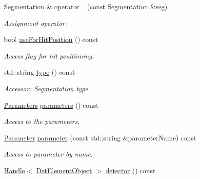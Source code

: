 \begin{DoxyCompactItemize}
\hyperlink{class_d_d4hep_1_1_geometry_1_1_segmentation}{Segmentation} \& \hyperlink{class_d_d4hep_1_1_geometry_1_1_segmentation_ace2a6174d3578ff2fdee66e0de399219}{operator=} (const \hyperlink{class_d_d4hep_1_1_geometry_1_1_segmentation}{Segmentation} \&seg)
\begin{DoxyCompactList}\small\item\em Assignment operator. \item\end{DoxyCompactList}\item 
bool \hyperlink{class_d_d4hep_1_1_geometry_1_1_segmentation_a3cf42d5fcbc3e68a8b4854145c9381e4}{useForHitPosition} () const 
\begin{DoxyCompactList}\small\item\em Access flag for hit positioning. \item\end{DoxyCompactList}\item 
std::string \hyperlink{class_d_d4hep_1_1_geometry_1_1_segmentation_af56809ba4916a75514d320b5c74329d7}{type} () const 
\begin{DoxyCompactList}\small\item\em Accessor: \hyperlink{class_d_d4hep_1_1_geometry_1_1_segmentation}{Segmentation} type. \item\end{DoxyCompactList}\item 
\hyperlink{class_d_d4hep_1_1_geometry_1_1_segmentation_af7d9af7b574fa9039f44befc61b7e46f}{Parameters} \hyperlink{class_d_d4hep_1_1_geometry_1_1_segmentation_ab1acab9aa381fcdcab2e63114db9a27d}{parameters} () const 
\begin{DoxyCompactList}\small\item\em Access to the parameters. \item\end{DoxyCompactList}\item 
\hyperlink{class_d_d4hep_1_1_d_d_segmentation_1_1_segmentation_parameter}{Parameter} \hyperlink{class_d_d4hep_1_1_geometry_1_1_segmentation_ab82b22908399f15baf66ed2dff02cba7}{parameter} (const std::string \&parameterName) const 
\begin{DoxyCompactList}\small\item\em Access to parameter by name. \item\end{DoxyCompactList}\item 
\hyperlink{class_d_d4hep_1_1_handle}{Handle}$<$ \hyperlink{class_d_d4hep_1_1_geometry_1_1_det_element_object}{DetElementObject} $>$ \hyperlink{class_d_d4hep_1_1_geometry_1_1_segmentation_ac2b190aa90d1aab39f40d63ae000c614}{detector} () const 

\end{DoxyCompactItemize}
